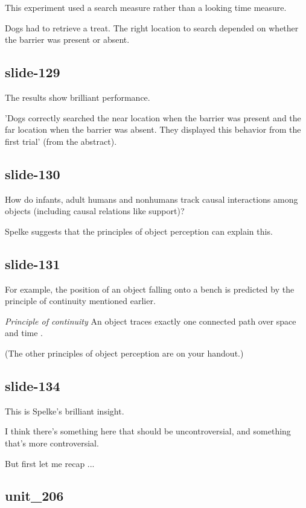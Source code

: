 \documentclass[12pt,\papersize]{extarticle}
\begin{document}
This experiment used a search measure rather than a looking time measure.
 
Dogs had to retrieve a treat.  The right location to search depended on whether the barrier was present or absent.
 
\subsection{slide-129}
The results show brilliant performance.
 
'Dogs correctly searched the near location when the barrier was present and the far location when the barrier was absent. They displayed this behavior from the first trial' \citep{kundey:2010_domesticated} (from the abstract).
 
\subsection{slide-130}
How do infants, adult humans and nonhumans track causal interactions among objects (including causal relations like support)?
 
Spelke suggests that the principles of object perception can explain this.
 
\subsection{slide-131}
For example, the position of an object falling onto a bench is predicted by the principle of continuity mentioned earlier.
 
\emph{Principle of continuity} An object traces exactly one connected path over space and time \citep[p.\ 113]{spelke:1995_spatiotemporal}.
 
(The other principles of object perception are on your handout.)
 
\subsection{slide-134}
This is Spelke's brilliant insight.
 
I think there's something here that should be uncontroversial, and something that's more controversial.
 
But first let me recap ...
 
\subsection{unit\_206}
 
\end{document}
